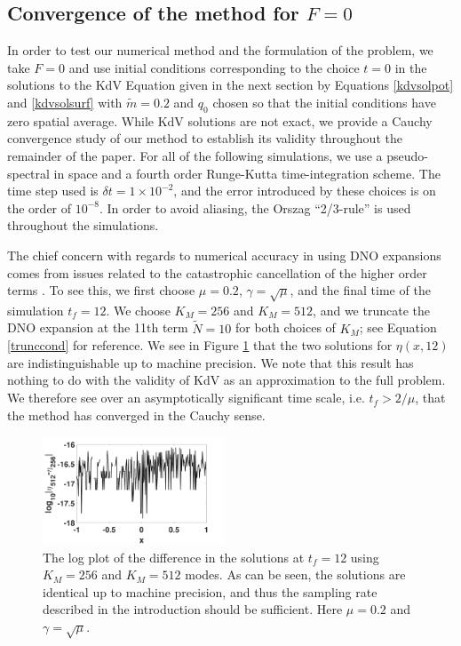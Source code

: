 \documentclass[a4paper,11pt]{article}
\begin{document}
\subsection{Convergence of the method for $F=0$}

In order to test our numerical method and the formulation of the problem, we take $F=0$ and use initial conditions corresponding to the choice $t=0$ in the solutions to the KdV Equation given in the next section by Equations \eqref{kdvsolpot} and \eqref{kdvsolsurf} with $\tilde{m}=0.2$ and $q_{0}$ chosen so that the initial conditions have zero spatial average.  While KdV solutions are not exact, we provide a Cauchy convergence study of our method to establish its validity throughout the remainder of the paper.  For all of the following simulations, we use a pseudo-spectral in space and a fourth order Runge-Kutta time-integration scheme. 
The time step used is $\delta t = 1\times 10^{-2}$, and the error introduced by these choices is on the order of $10^{-8}$.  In order to avoid aliasing, the Orszag ``2/3-rule'' is used throughout the simulations. 

The chief concern with regards to numerical accuracy in using DNO expansions comes from issues related to the catastrophic cancellation of the higher order terms \cite{wilkening}. To see this, we first choose $\mu=0.2$, $\gamma=\sqrt{\mu}$, and the final time of the simulation $t_{f}=12$.  We choose $K_{M}=256$ and $K_{M}=512$, and we truncate the DNO expansion at the 11th term $\tilde{N}=10$ for both choices of $K_{M}$; see Equation \eqref{trunccond} for reference.  We see in Figure \ref{fig:convcomp} that the two solutions for $\eta(x,12)$ are indistinguishable up to machine precision.  We note that this result has nothing to do with the validity of KdV as an approximation to the full problem.  We therefore see over an asymptotically significant time scale, i.e. $t_{f} > 2/\mu$, that the method has converged in the Cauchy sense.    
\begin{figure}[h]
\centering
\includegraphics[width=0.48\textwidth]{conv_plot_tf_12}
\caption{The log plot of the difference in the solutions at $t_{f} = 12$ using $K_{M}=256$ and $K_{M}=512$ modes.  As can be seen, the solutions are identical up to machine precision, and thus the sampling rate described in the introduction should be sufficient.  Here $\mu=0.2$ and $\gamma=\sqrt{\mu}$.}
\label{fig:convcomp}
\end{figure}
\end{document}
